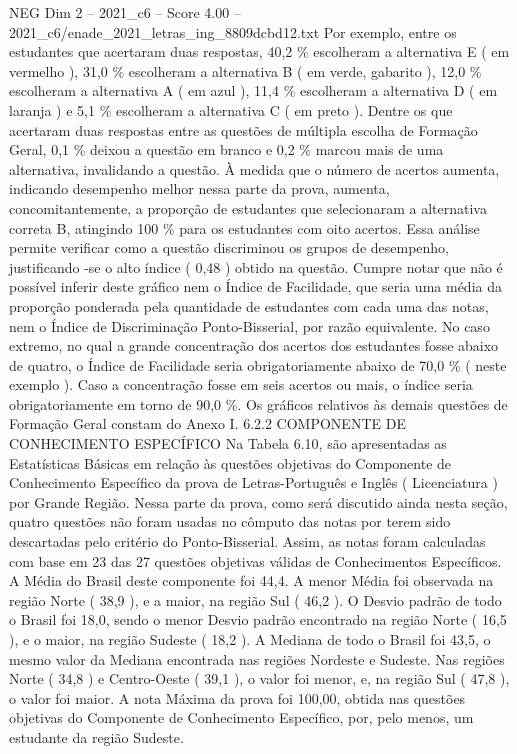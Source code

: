 \begin{textsample}{NEG Dim 2 – 2021\_c6 – Score 4.00 – 2021\_c6/enade\_2021\_letras\_ing\_8809dcbd12.txt}
Por exemplo, entre os estudantes que acertaram duas respostas, 40,2 \% escolheram a alternativa E ( em vermelho ), 31,0 \% escolheram a alternativa B ( em verde, gabarito ), 12,0 \% escolheram a alternativa A ( em azul ), 11,4 \% escolheram a alternativa D ( em laranja ) e 5,1 \% escolheram a alternativa C ( em preto ).
Dentre os que acertaram duas respostas entre as questões de múltipla escolha de Formação Geral, 0,1 \% deixou a questão em branco e 0,2 \% marcou mais de uma alternativa, invalidando a questão.
À medida que o número de acertos aumenta, indicando desempenho melhor nessa parte da prova, aumenta, concomitantemente, a proporção de estudantes que selecionaram a alternativa correta B, atingindo 100 \% para os estudantes com oito acertos.
Essa análise permite verificar como a questão discriminou os grupos de desempenho, justificando -se o alto índice ( 0,48 ) obtido na questão.
Cumpre notar que não é possível inferir deste gráfico nem o Índice de Facilidade, que seria uma média da proporção ponderada pela quantidade de estudantes com cada uma das notas, nem o Índice de Discriminação Ponto-Bisserial, por razão equivalente.
No caso extremo, no qual a grande concentração dos acertos dos estudantes fosse abaixo de quatro, o Índice de Facilidade seria obrigatoriamente abaixo de 70,0 \% ( neste exemplo ).
Caso a concentração fosse em seis acertos ou mais, o índice seria obrigatoriamente em torno de 90,0 \%.
Os gráficos relativos às demais questões de Formação Geral constam do Anexo I. 6.2.2 COMPONENTE DE CONHECIMENTO ESPECÍFICO Na Tabela 6.10, são apresentadas as Estatísticas Básicas em relação às questões objetivas do Componente de Conhecimento Específico da prova de Letras-Português e Inglês ( Licenciatura ) por Grande Região.
Nessa parte da prova, como será discutido ainda nesta seção, quatro questões não foram usadas no cômputo das notas por terem sido descartadas pelo critério do Ponto-Bisserial.
Assim, as notas foram calculadas com base em 23 das 27 questões objetivas válidas de Conhecimentos Específicos.
A Média do Brasil deste componente foi 44,4.
A menor Média foi observada na região Norte ( 38,9 ), e a maior, na região Sul ( 46,2 ).
O Desvio padrão de todo o Brasil foi 18,0, sendo o menor Desvio padrão encontrado na região Norte ( 16,5 ), e o maior, na região Sudeste ( 18,2 ).
A Mediana de todo o Brasil foi 43,5, o mesmo valor da Mediana encontrada nas regiões Nordeste e Sudeste.
Nas regiões Norte ( 34,8 ) e Centro-Oeste ( 39,1 ), o valor foi menor, e, na região Sul ( 47,8 ), o valor foi maior.
A nota Máxima da prova foi 100,00, obtida nas questões objetivas do Componente de Conhecimento Específico, por, pelo menos, um estudante da região Sudeste.

\end{textsample}
